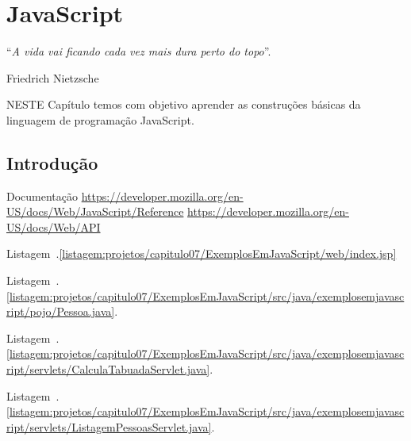 \chapter{JavaScript}\label{cap:javaScript}
\epigraph{``\textit{A vida vai ficando cada vez mais dura perto do topo}''.}{Friedrich Nietzsche}

\lettrine[lines=4, lhang=0.1, lraise=0, loversize=0.2, findent=0.1em]{\textcolor{corAzulTema}{N}}{ESTE} Capítulo temos com objetivo aprender as construções básicas da linguagem de programação JavaScript.

\section{Introdução}

Documentação
\url{https://developer.mozilla.org/en-US/docs/Web/JavaScript/Reference}
\url{https://developer.mozilla.org/en-US/docs/Web/API}

Listagem~\thechapter.\ref{listagem:projetos/capitulo07/ExemplosEmJavaScript/web/index.jsp}



Listagem~\thechapter.\ref{listagem:projetos/capitulo07/ExemplosEmJavaScript/src/java/exemplosemjavascript/pojo/Pessoa.java}.



Listagem~\thechapter.\ref{listagem:projetos/capitulo07/ExemplosEmJavaScript/src/java/exemplosemjavascript/servlets/CalculaTabuadaServlet.java}.



Listagem~\thechapter.\ref{listagem:projetos/capitulo07/ExemplosEmJavaScript/src/java/exemplosemjavascript/servlets/ListagemPessoasServlet.java}.



